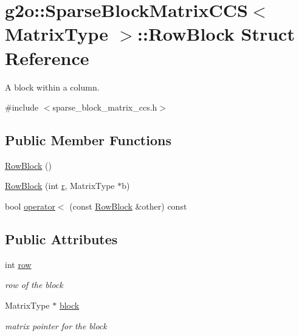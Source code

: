 \hypertarget{structg2o_1_1SparseBlockMatrixCCS_1_1RowBlock}{}\section{g2o\+:\+:Sparse\+Block\+Matrix\+C\+CS$<$ Matrix\+Type $>$\+:\+:Row\+Block Struct Reference}
\label{structg2o_1_1SparseBlockMatrixCCS_1_1RowBlock}


A block within a column.  




{\ttfamily \#include $<$sparse\+\_\+block\+\_\+matrix\+\_\+ccs.\+h$>$}

\subsection*{Public Member Functions}
\begin{DoxyCompactItemize}
\item 
\hyperlink{structg2o_1_1SparseBlockMatrixCCS_1_1RowBlock_a0c9f288219a7fd8ad58c1dd2214734f5}{Row\+Block} ()
\item 
\hyperlink{structg2o_1_1SparseBlockMatrixCCS_1_1RowBlock_a78e2ec549fa14a225280b94022d05cea}{Row\+Block} (int \hyperlink{sparse__helper_8cpp_acab531abaa74a7e664e3986f2522b33a}{r}, Matrix\+Type $\ast$b)
\item 
bool \hyperlink{structg2o_1_1SparseBlockMatrixCCS_1_1RowBlock_a13e5fb6f5883f74e44bdd89c75ab9968}{operator$<$} (const \hyperlink{structg2o_1_1SparseBlockMatrixCCS_1_1RowBlock}{Row\+Block} \&other) const 
\end{DoxyCompactItemize}
\subsection*{Public Attributes}
\begin{DoxyCompactItemize}
\item 
int \hyperlink{structg2o_1_1SparseBlockMatrixCCS_1_1RowBlock_af414f235d5aa28ca1508cfa0860c4949}{row}
\begin{DoxyCompactList}\small\item\em row of the block \end{DoxyCompactList}\item 
Matrix\+Type $\ast$ \hyperlink{structg2o_1_1SparseBlockMatrixCCS_1_1RowBlock_a88ab75d0e29496d3ca023105256a2926}{block}
\begin{DoxyCompactList}\small\item\em matrix pointer for the block \end{DoxyCompactList}\end{DoxyCompactItemize}


